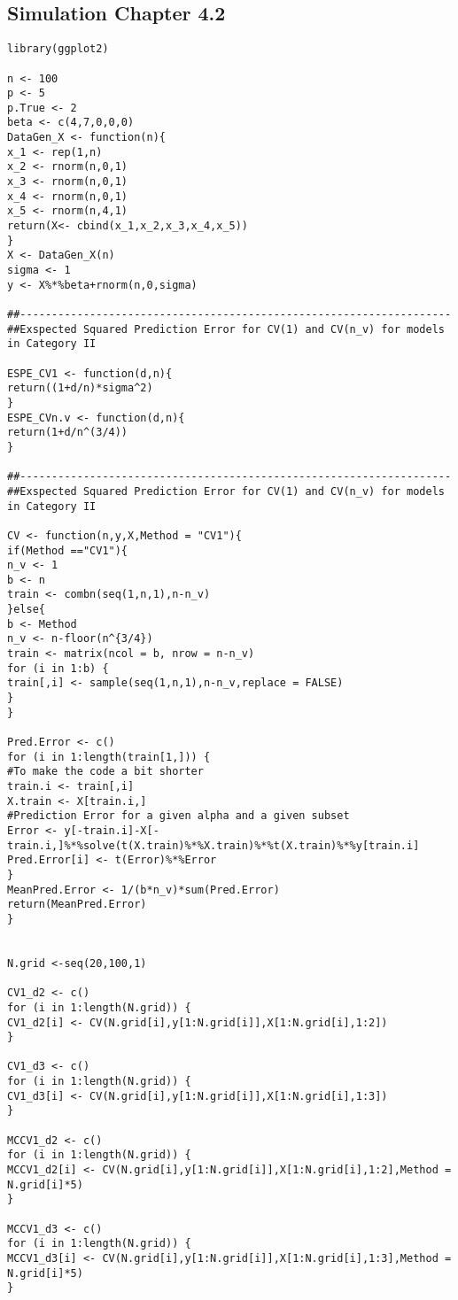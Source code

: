 \documentclass[Research_Module_ES.tex]{subfiles}
\begin{document}
\subsection{Simulation Chapter 4.2}
\begin{lstlisting}[title={Simulation Graphic Ilustration Exspected Squared Prediction Error CV1 and CV($n_\nu$)}]
library(ggplot2)

n <- 100
p <- 5
p.True <- 2
beta <- c(4,7,0,0,0)
DataGen_X <- function(n){
x_1 <- rep(1,n)         
x_2 <- rnorm(n,0,1)
x_3 <- rnorm(n,0,1)
x_4 <- rnorm(n,0,1)
x_5 <- rnorm(n,4,1)
return(X<- cbind(x_1,x_2,x_3,x_4,x_5))
}
X <- DataGen_X(n)
sigma <- 1
y <- X%*%beta+rnorm(n,0,sigma)

##--------------------------------------------------------------------
##Exspected Squared Prediction Error for CV(1) and CV(n_v) for models in Category II

ESPE_CV1 <- function(d,n){
return((1+d/n)*sigma^2)
}
ESPE_CVn.v <- function(d,n){
return(1+d/n^(3/4))
}

##--------------------------------------------------------------------
##Exspected Squared Prediction Error for CV(1) and CV(n_v) for models in Category II

CV <- function(n,y,X,Method = "CV1"){
if(Method =="CV1"){
n_v <- 1
b <- n
train <- combn(seq(1,n,1),n-n_v)
}else{
b <- Method
n_v <- n-floor(n^{3/4})
train <- matrix(ncol = b, nrow = n-n_v)
for (i in 1:b) {
train[,i] <- sample(seq(1,n,1),n-n_v,replace = FALSE)
}
}

Pred.Error <- c()
for (i in 1:length(train[1,])) {
#To make the code a bit shorter
train.i <- train[,i]                 
X.train <- X[train.i,]    
#Prediction Error for a given alpha and a given subset
Error <- y[-train.i]-X[-train.i,]%*%solve(t(X.train)%*%X.train)%*%t(X.train)%*%y[train.i]
Pred.Error[i] <- t(Error)%*%Error
}
MeanPred.Error <- 1/(b*n_v)*sum(Pred.Error)
return(MeanPred.Error)
}


N.grid <-seq(20,100,1)

CV1_d2 <- c()
for (i in 1:length(N.grid)) {
CV1_d2[i] <- CV(N.grid[i],y[1:N.grid[i]],X[1:N.grid[i],1:2])
}

CV1_d3 <- c()
for (i in 1:length(N.grid)) {
CV1_d3[i] <- CV(N.grid[i],y[1:N.grid[i]],X[1:N.grid[i],1:3])
}

MCCV1_d2 <- c()
for (i in 1:length(N.grid)) {
MCCV1_d2[i] <- CV(N.grid[i],y[1:N.grid[i]],X[1:N.grid[i],1:2],Method = N.grid[i]*5)
}

MCCV1_d3 <- c()
for (i in 1:length(N.grid)) {
MCCV1_d3[i] <- CV(N.grid[i],y[1:N.grid[i]],X[1:N.grid[i],1:3],Method = N.grid[i]*5)
}


\end{lstlisting}
\end{document}
